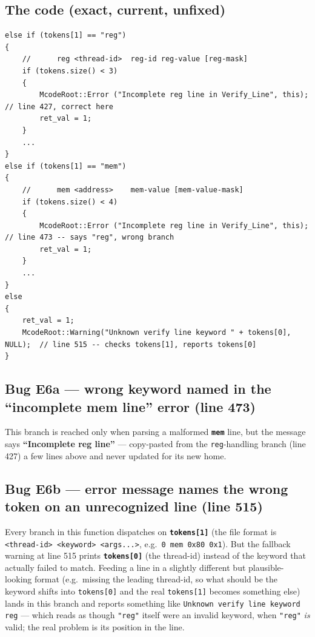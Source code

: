 \documentclass[11pt,a4paper]{report}
\begin{document}
\subsection*{The code (exact, current, unfixed)}
\begin{lstlisting}[caption={\texttt{McodeAccelerator.cpp}, \texttt{Verify\_Line}, relevant excerpts (lines 422--516)}]
else if (tokens[1] == "reg")
{
    //      reg <thread-id>  reg-id reg-value [reg-mask]
    if (tokens.size() < 3)
    {
        McodeRoot::Error ("Incomplete reg line in Verify_Line", this);   // line 427, correct here
        ret_val = 1;
    }
    ...
}
else if (tokens[1] == "mem")
{
    //      mem <address>    mem-value [mem-value-mask]
    if (tokens.size() < 4)
    {
        McodeRoot::Error ("Incomplete reg line in Verify_Line", this);   // line 473 -- says "reg", wrong branch
        ret_val = 1;
    }
    ...
}
else
{
    ret_val = 1;
    McodeRoot::Warning("Unknown verify line keyword " + tokens[0], NULL);  // line 515 -- checks tokens[1], reports tokens[0]
}
\end{lstlisting}

\subsection*{Bug E6a --- wrong keyword named in the ``incomplete mem line'' error (line 473)}
This branch is reached only when parsing a malformed \textbf{\texttt{mem}} line, but the
message says \textbf{``Incomplete reg line''} --- copy-pasted from the \texttt{reg}-handling
branch (line 427) a few lines above and never updated for its new home.

\subsection*{Bug E6b --- error message names the wrong token on an unrecognized line (line 515)}
Every branch in this function dispatches on \textbf{\texttt{tokens[1]}} (the file format is
\texttt{<thread-id> <keyword> <args...>}, e.g.\ \texttt{0 mem 0x80 0x1}). But the fallback
warning at line 515 prints \textbf{\texttt{tokens[0]}} (the thread-id) instead of the
keyword that actually failed to match. Feeding a line in a slightly different but
plausible-looking format (e.g.\ missing the leading thread-id, so what should be the
keyword shifts into \texttt{tokens[0]} and the real \texttt{tokens[1]} becomes something
else) lands in this branch and reports something like \texttt{Unknown verify line keyword
reg} --- which reads as though \texttt{"reg"} itself were an invalid keyword, when
\texttt{"reg"} \emph{is} valid; the real problem is its position in the line.
\end{document}
